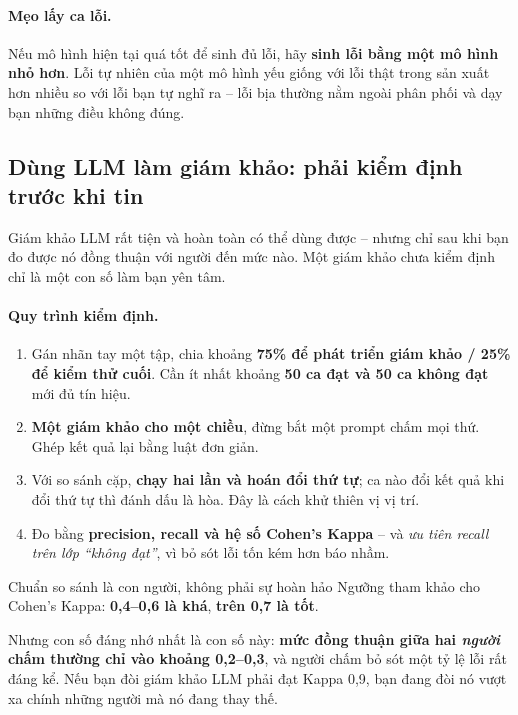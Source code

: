 \paragraph{Mẹo lấy ca lỗi.} Nếu mô hình hiện tại quá tốt để sinh đủ lỗi, hãy \textbf{sinh lỗi bằng một mô hình nhỏ hơn}. Lỗi tự nhiên của một mô hình yếu giống với lỗi thật trong sản xuất hơn nhiều so với lỗi bạn tự nghĩ ra -- lỗi bịa thường nằm ngoài phân phối và dạy bạn những điều không đúng.

\subsection{Dùng LLM làm giám khảo: phải kiểm định trước khi tin}
\label{ssec:llm_judge_validation}

Giám khảo LLM rất tiện và hoàn toàn có thể dùng được -- nhưng chỉ sau khi bạn đo được nó đồng thuận với người đến mức nào. Một giám khảo chưa kiểm định chỉ là một con số làm bạn yên tâm.

\paragraph{Quy trình kiểm định.}
\begin{enumerate}
	\item Gán nhãn tay một tập, chia khoảng \textbf{75\% để phát triển giám khảo / 25\% để kiểm thử cuối}. Cần ít nhất khoảng \textbf{50 ca đạt và 50 ca không đạt} mới đủ tín hiệu.
	\item \textbf{Một giám khảo cho một chiều}, đừng bắt một prompt chấm mọi thứ. Ghép kết quả lại bằng luật đơn giản.
	\item Với so sánh cặp, \textbf{chạy hai lần và hoán đổi thứ tự}; ca nào đổi kết quả khi đổi thứ tự thì đánh dấu là hòa. Đây là cách khử thiên vị vị trí.
	\item Đo bằng \textbf{precision, recall và hệ số Cohen's Kappa} -- và \emph{ưu tiên recall trên lớp “không đạt”}, vì bỏ sót lỗi tốn kém hơn báo nhầm.
\end{enumerate}

\begin{assess}{Chuẩn so sánh là con người, không phải sự hoàn hảo}
Ngưỡng tham khảo cho Cohen's Kappa: \textbf{0{,}4--0{,}6 là khá}, \textbf{trên 0{,}7 là tốt}.

Nhưng con số đáng nhớ nhất là con số này: \textbf{mức đồng thuận giữa hai \emph{người} chấm thường chỉ vào khoảng 0{,}2--0{,}3}, và người chấm bỏ sót một tỷ lệ lỗi rất đáng kể. Nếu bạn đòi giám khảo LLM phải đạt Kappa 0{,}9, bạn đang đòi nó vượt xa chính những người mà nó đang thay thế.
\end{assess}

